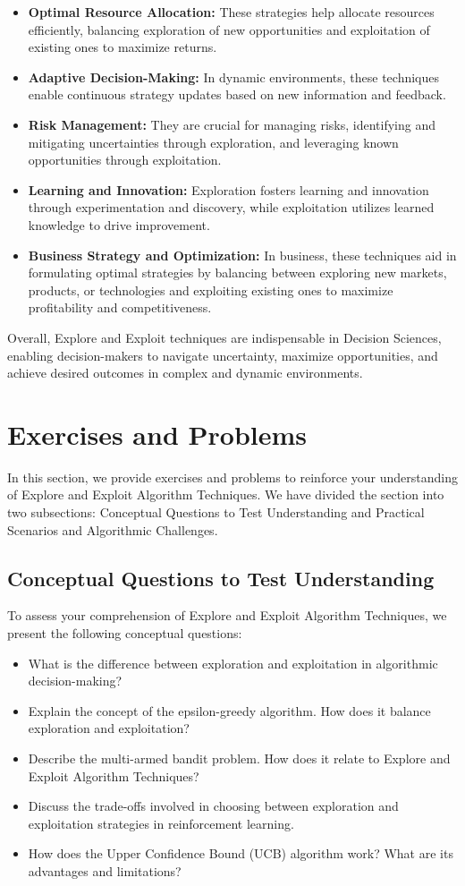 \documentclass[12pt]{book} %
\begin{document}
\begin{itemize}
    \item \textbf{Optimal Resource Allocation:} These strategies help allocate resources efficiently, balancing exploration of new opportunities and exploitation of existing ones to maximize returns.
    \item \textbf{Adaptive Decision-Making:} In dynamic environments, these techniques enable continuous strategy updates based on new information and feedback.
    \item \textbf{Risk Management:} They are crucial for managing risks, identifying and mitigating uncertainties through exploration, and leveraging known opportunities through exploitation.
    \item \textbf{Learning and Innovation:} Exploration fosters learning and innovation through experimentation and discovery, while exploitation utilizes learned knowledge to drive improvement.
    \item \textbf{Business Strategy and Optimization:} In business, these techniques aid in formulating optimal strategies by balancing between exploring new markets, products, or technologies and exploiting existing ones to maximize profitability and competitiveness.
\end{itemize}

Overall, Explore and Exploit techniques are indispensable in Decision Sciences, enabling decision-makers to navigate uncertainty, maximize opportunities, and achieve desired outcomes in complex and dynamic environments.


\section{Exercises and Problems}
In this section, we provide exercises and problems to reinforce your understanding of Explore and Exploit Algorithm Techniques. We have divided the section into two subsections: Conceptual Questions to Test Understanding and Practical Scenarios and Algorithmic Challenges.

\subsection{Conceptual Questions to Test Understanding}
To assess your comprehension of Explore and Exploit Algorithm Techniques, we present the following conceptual questions:
\begin{itemize}
    \item What is the difference between exploration and exploitation in algorithmic decision-making?
    \item Explain the concept of the epsilon-greedy algorithm. How does it balance exploration and exploitation?
    \item Describe the multi-armed bandit problem. How does it relate to Explore and Exploit Algorithm Techniques?
    \item Discuss the trade-offs involved in choosing between exploration and exploitation strategies in reinforcement learning.
    \item How does the Upper Confidence Bound (UCB) algorithm work? What are its advantages and limitations?
\end{itemize}
\end{document}
